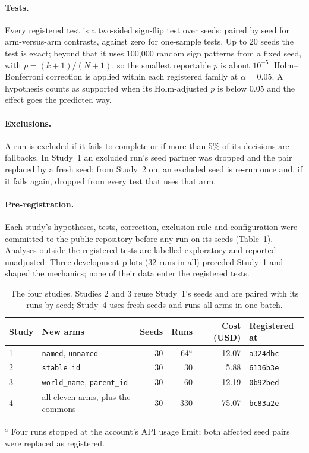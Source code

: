 \documentclass[11pt]{article}
\newcommand{\arm}[1]{\texttt{#1}}
\newcommand{\STUDYFOURRUNS}{330}
\newcommand{\STUDYFOURCOST}{75.07}
\begin{document}
\paragraph{Tests.} Every registered test is a two-sided sign-flip test over seeds: paired by seed
for arm-versus-arm contrasts, against zero for one-sample tests. Up to 20 seeds the test is exact;
beyond that it uses 100,000 random sign patterns from a fixed seed, with $p=(k+1)/(N+1)$, so the
smallest reportable $p$ is about $10^{-5}$. Holm--Bonferroni correction is applied within each
registered family at $\alpha=0.05$. A hypothesis counts as supported when its Holm-adjusted $p$ is
below 0.05 and the effect goes the predicted way.

\paragraph{Exclusions.} A run is excluded if it fails to complete or if more than 5\% of its
decisions are fallbacks. In Study~1 an excluded run's seed partner was dropped and the pair
replaced by a fresh seed; from Study~2 on, an excluded seed is re-run once and, if it fails again,
dropped from every test that uses that arm.

\paragraph{Pre-registration.} Each study's hypotheses, tests, correction, exclusion rule and
configuration were committed to the public repository before any run on its seeds
(Table~\ref{tab:studies}). Analyses outside the registered tests are labelled exploratory and
reported unadjusted. Three development pilots (32 runs in all) preceded Study~1 and shaped the
mechanics; none of their data enter the registered tests.

\begin{table}[t]
\centering
\small
\caption{The four studies. Studies 2 and 3 reuse Study~1's seeds and are paired with its runs by
seed; Study~4 uses fresh seeds and runs all arms in one batch.}
\label{tab:studies}
\begin{tabular}{@{}l l r r r l@{}}
\toprule
Study & New arms & Seeds & Runs & Cost (USD) & Registered at \\
\midrule
1 & \arm{named}, \arm{unnamed} & 30 & 64$^a$ & 12.07 & \texttt{a324dbc} \\
2 & \arm{stable\_id} & 30 & 30 & 5.88 & \texttt{6136b3e} \\
3 & \arm{world\_name}, \arm{parent\_id} & 30 & 60 & 12.19 & \texttt{0b92bed} \\
4 & all eleven arms, plus the commons & 30 & \STUDYFOURRUNS & \STUDYFOURCOST & \texttt{bc83a2e} \\
\bottomrule
\end{tabular}
\par\smallskip
{\footnotesize $^a$ Four runs stopped at the account's API usage limit; both affected seed pairs
were replaced as registered.}
\end{table}
\end{document}
